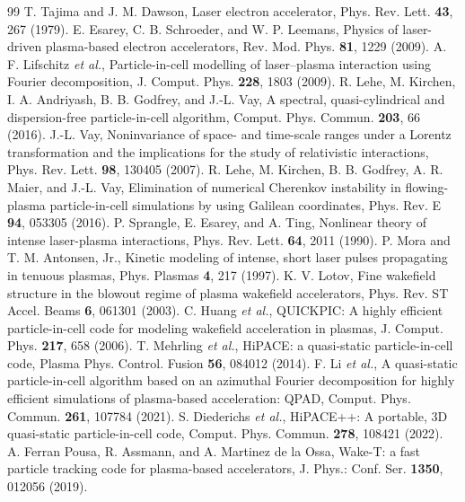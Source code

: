 \documentclass[aps,prab,reprint,floatfix,superscriptaddress,amsmath,amssymb]{revtex4-2}
\begin{document}
\begin{thebibliography}{99}
 T. Tajima and J. M. Dawson, Laser electron accelerator, Phys. Rev. Lett. \textbf{43}, 267 (1979).
 E. Esarey, C. B. Schroeder, and W. P. Leemans, Physics of laser-driven plasma-based electron accelerators, Rev. Mod. Phys. \textbf{81}, 1229 (2009).
 A. F. Lifschitz \textit{et al.}, Particle-in-cell modelling of laser--plasma interaction using Fourier decomposition, J. Comput. Phys. \textbf{228}, 1803 (2009).
 R. Lehe, M. Kirchen, I. A. Andriyash, B. B. Godfrey, and J.-L. Vay, A spectral, quasi-cylindrical and dispersion-free particle-in-cell algorithm, Comput. Phys. Commun. \textbf{203}, 66 (2016).
 J.-L. Vay, Noninvariance of space- and time-scale ranges under a Lorentz transformation and the implications for the study of relativistic interactions, Phys. Rev. Lett. \textbf{98}, 130405 (2007).
 R. Lehe, M. Kirchen, B. B. Godfrey, A. R. Maier, and J.-L. Vay, Elimination of numerical Cherenkov instability in flowing-plasma particle-in-cell simulations by using Galilean coordinates, Phys. Rev. E \textbf{94}, 053305 (2016).
 P. Sprangle, E. Esarey, and A. Ting, Nonlinear theory of intense laser-plasma interactions, Phys. Rev. Lett. \textbf{64}, 2011 (1990).
 P. Mora and T. M. Antonsen, Jr., Kinetic modeling of intense, short laser pulses propagating in tenuous plasmas, Phys. Plasmas \textbf{4}, 217 (1997).
 K. V. Lotov, Fine wakefield structure in the blowout regime of plasma wakefield accelerators, Phys. Rev. ST Accel. Beams \textbf{6}, 061301 (2003).
 C. Huang \textit{et al.}, QUICKPIC: A highly efficient particle-in-cell code for modeling wakefield acceleration in plasmas, J. Comput. Phys. \textbf{217}, 658 (2006).
 T. Mehrling \textit{et al.}, HiPACE: a quasi-static particle-in-cell code, Plasma Phys. Control. Fusion \textbf{56}, 084012 (2014).
 F. Li \textit{et al.}, A quasi-static particle-in-cell algorithm based on an azimuthal Fourier decomposition for highly efficient simulations of plasma-based acceleration: QPAD, Comput. Phys. Commun. \textbf{261}, 107784 (2021).
 S. Diederichs \textit{et al.}, HiPACE++: A portable, 3D quasi-static particle-in-cell code, Comput. Phys. Commun. \textbf{278}, 108421 (2022).
 A. Ferran Pousa, R. Assmann, and A. Martinez de la Ossa, Wake-T: a fast particle tracking code for plasma-based accelerators, J. Phys.: Conf. Ser. \textbf{1350}, 012056 (2019).

\end{thebibliography}
\end{document}
